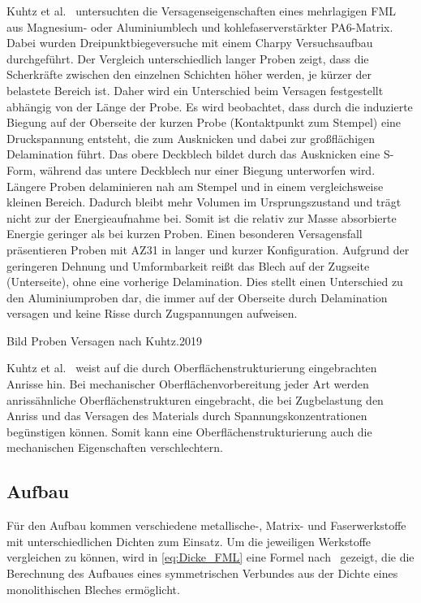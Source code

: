 Kuhtz et al.~\cite{Kuhtz2019} untersuchten die Versagenseigenschaften eines mehrlagigen FML aus Magnesium- oder Aluminiumblech und kohlefaserverstärkter PA6-Matrix.
Dabei wurden Dreipunktbiegeversuche mit einem Charpy Versuchsaufbau durchgeführt.
Der Vergleich unterschiedlich langer Proben zeigt, dass die Scherkräfte zwischen den einzelnen Schichten höher werden, je kürzer der belastete Bereich ist.
Daher wird ein Unterschied beim Versagen festgestellt abhängig von der Länge der Probe.
Es wird beobachtet, dass durch die induzierte Biegung auf der Oberseite der kurzen Probe (Kontaktpunkt zum Stempel) eine Druckspannung entsteht, die zum Ausknicken und dabei zur großflächigen Delamination führt.
Das obere Deckblech bildet durch das Ausknicken eine S-Form, während das untere Deckblech nur einer Biegung unterworfen wird.
Längere Proben delaminieren nah am Stempel und in einem vergleichsweise kleinen Bereich.
Dadurch bleibt mehr Volumen im Ursprungszustand und trägt nicht zur der Energieaufnahme bei.
Somit ist die relativ zur Masse absorbierte Energie geringer als bei kurzen Proben.
Einen besonderen Versagensfall präsentieren Proben mit AZ31 in langer und kurzer Konfiguration.
Aufgrund der geringeren Dehnung und Umformbarkeit reißt das Blech auf der Zugseite (Unterseite), ohne eine vorherige Delamination.
Dies stellt einen Unterschied zu den Aluminiumproben dar, die immer auf der Oberseite durch Delamination versagen und keine Risse durch Zugspannungen aufweisen.

Bild Proben Versagen nach Kuhtz.2019

Kuhtz et al.~\cite{Kuhtz2019} weist auf die durch Oberflächenstrukturierung eingebrachten Anrisse hin.
Bei mechanischer Oberflächenvorbereitung jeder Art werden anrissähnliche Oberflächenstrukturen eingebracht, die bei Zugbelastung den Anriss und das Versagen des Materials durch Spannungskonzentrationen begünstigen können.
Somit kann eine Oberflächenstrukturierung auch die mechanischen Eigenschaften verschlechtern.

\subsection{Aufbau}\label{subsec:aufbau}

Für den Aufbau kommen verschiedene metallische-, Matrix- und Faserwerkstoffe mit unterschiedlichen Dichten zum Einsatz.
Um die jeweiligen Werkstoffe vergleichen zu können, wird in \autoref{eq:Dicke_FML} eine Formel nach~\cite{Wollmann2018} gezeigt, die die Berechnung des Aufbaues eines symmetrischen Verbundes aus der Dichte eines monolithischen Bleches ermöglicht.

